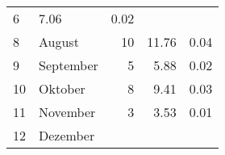 \begin{longtable}{lXrrr}
       \num{6} &
       \num[round-mode=places,round-precision=2]{7,06} &
         \num[round-mode=places,round-precision=2]{0,02} \\

     8 &
     \multicolumn{1}{X}{ August   } &


       \num{10} &
       \num[round-mode=places,round-precision=2]{11,76} &
         \num[round-mode=places,round-precision=2]{0,04} \\

     9 &
     \multicolumn{1}{X}{ September   } &


       \num{5} &
       \num[round-mode=places,round-precision=2]{5,88} &
         \num[round-mode=places,round-precision=2]{0,02} \\

     10 &
     \multicolumn{1}{X}{ Oktober   } &


       \num{8} &
       \num[round-mode=places,round-precision=2]{9,41} &
         \num[round-mode=places,round-precision=2]{0,03} \\

     11 &
     \multicolumn{1}{X}{ November   } &


       \num{3} &
       \num[round-mode=places,round-precision=2]{3,53} &
         \num[round-mode=places,round-precision=2]{0,01} \\

     12 &
     \multicolumn{1}{X}{ Dezember   } &



\end{longtable}
